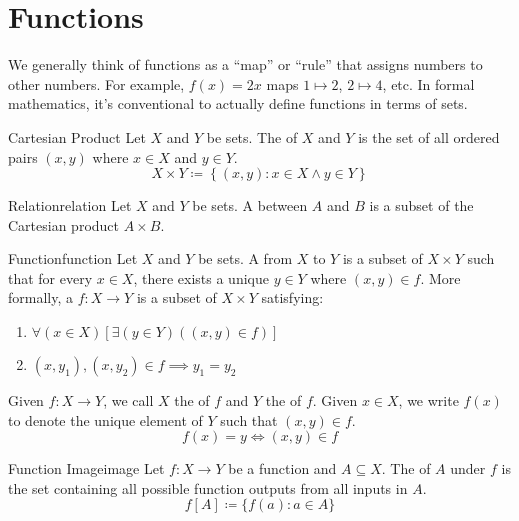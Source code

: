 \section{Functions}
We generally think of functions as a ``map'' or ``rule'' that assigns numbers to other numbers. For example, $f(x) = 2x$ maps $1 \mapsto 2$, $2 \mapsto 4$, etc. In formal mathematics, it's conventional to actually define functions in terms of sets.


\begin{dfnbox}{Cartesian Product}{}
    Let $X$ and $Y$ be sets. The  of $X$ and $Y$ is the set of all ordered pairs $(x,y)$ where $x \in X$ and $y \in Y$.
    \tcblower
    \[ X \times Y \coloneq \left\{ (x,y) : x \in X \land y \in Y \right\} \]
\end{dfnbox}

\begin{dfnbox}{Relation}{relation}
    Let $X$ and $Y$ be sets. A  between $A$ and $B$ is a subset of the Cartesian product $A \times B$.
\end{dfnbox}

\begin{dfnbox}{Function}{function}
    Let $X$ and $Y$ be sets. A  from $X$ to $Y$ is a subset of $X \times Y$ such that for every $x \in X$, there exists a unique $y \in Y$ where $(x,y) \in f$.
    \tcblower
    More formally, a  $f : X \to Y$ is a subset of $X \times Y$ satisfying:
    \begin{enumerate}[noitemsep]
        \item $\forall (x \in X) \left[ \exists (y \in Y)((x,y) \in f) \right]$
        \item $(x,y_1),(x,y_2) \in f \implies y_1 = y_2$
    \end{enumerate}
\end{dfnbox}


Given $f : X \to Y$, we call $X$ the  of $f$ and $Y$ the  of $f$. Given $x \in X$, we write $f(x)$ to denote the unique element of $Y$ such that $(x,y) \in f$.
\[ f(x) = y \iff (x,y) \in f \]

\begin{dfnbox}{Function Image}{image}
    Let $f : X \to Y$ be a function and $A \subseteq X$. The  of $A$ under $f$ is the set containing all possible function outputs from all inputs in $A$.
    \tcblower
    \[ f[A] \coloneq \{ f(a) : a \in A \} \]
\end{dfnbox}


